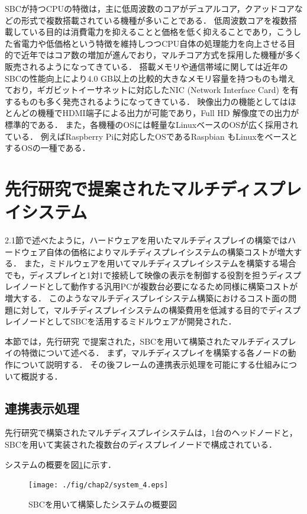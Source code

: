 SBCが持つCPUの特徴は，主に低周波数のコアがデュアルコア，クアッドコアなどの形式で複数搭載されている機種が多いことである．
低周波数コアを複数搭載している目的は消費電力を抑えることと価格を低く抑えることであり，こうした省電力や低価格という特徴を維持しつつCPU自体の処理能力を向上させる目的で近年ではコア数の増加が進んでおり，マルチコア方式を採用した機種が多く販売されるようになってきている．
搭載メモリや通信帯域に関しては近年のSBCの性能向上により4.0 GB以上の比較的大きなメモリ容量を持つものも増えており，ギガビットイーサネットに対応したNIC (Network Interface Card) を有するものも多く発売されるようになってきている．
映像出力の機能としてはほとんどの機種でHDMI端子による出力が可能であり，Full HD 解像度での出力が標準的である．
また，各機種のOSには軽量なLinuxベースのOSが広く採用されている．
例えばRaspberry Piに対応したOSであるRaspbian \cite{raspbian}もLinuxをベースとするOSの一種である．



\section{先行研究で提案されたマルチディスプレイシステム}

2.1節で述べたように，ハードウェアを用いたマルチディスプレイの構築ではハードウェア自体の価格によりマルチディスプレイシステムの構築コストが増大する．
また，ミドルウェアを用いてマルチディスプレイシステムを構築する場合でも，ディスプレイと1対1で接続して映像の表示を制御する役割を担うディスプレイノードとして動作する汎用PCが複数台必要になるため同様に構築コストが増大する．
このようなマルチディスプレイシステム構築におけるコスト面の問題に対して，マルチディスプレイシステムの構築費用を低減する目的でディスプレイノードとしてSBCを活用するミドルウェアが開発された．

本節では，先行研究 \cite{Ishida}で提案された，SBCを用いて構築されたマルチディスプレイの特徴について述べる．
まず，マルチディスプレイを構築する各ノードの動作について説明する．
その後フレームの連携表示処理を可能にする仕組みについて概説する．

\subsection*{連携表示処理}

先行研究で構築されたマルチディスプレイシステムは，1台のヘッドノードと，SBCを用いて実装された複数台のディスプレイノードで構成されている．

システムの概要を図\ref{fig_2.4}に示す．

\begin{figure}[H]
  \hspace*{\fill}
  \texttt{[image: ./fig/chap2/system\_4.eps]}
  \hspace*{\fill}
  \caption{SBCを用いて構築したシステムの概要図}
  \label{fig_2.4}
 \end{figure}

